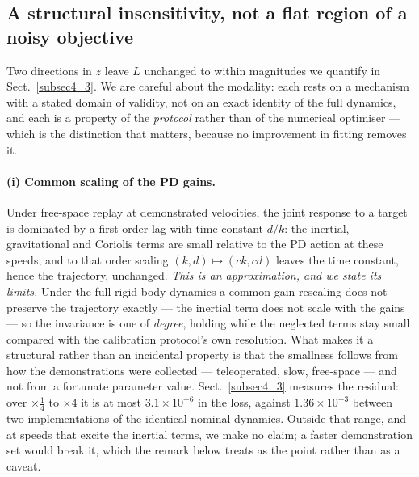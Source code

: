 \documentclass[pdflatex,iicol,sn-apa]{sn-jnl}
\theoremstyle{remark}
\begin{document}
\subsection{A structural insensitivity, not a flat region of a noisy objective}\label{subsec4_2}

Two directions in $z$ leave $L$ unchanged to within magnitudes we quantify in
Sect.~\ref{subsec4_3}. We are careful about the modality: each rests on a mechanism with a stated
domain of validity, not on an exact identity of the full dynamics, and each is a property of the
\emph{protocol} rather than of the numerical optimiser --- which is the distinction that matters,
because no improvement in fitting removes it.

\paragraph{(i) Common scaling of the PD gains.}
Under free-space replay at demonstrated velocities, the joint response to a target is dominated by a
first-order lag with time constant $d/k$: the inertial, gravitational and Coriolis terms are small
relative to the PD action at these speeds, and to that order scaling $(k, d) \mapsto (ck, cd)$ leaves
the time constant, hence the trajectory, unchanged. \emph{This is an approximation, and we state its
limits.} Under the full rigid-body dynamics a common gain rescaling does not preserve the trajectory
exactly --- the inertial term does not scale with the gains --- so the invariance is one of
\emph{degree}, holding while the neglected terms stay small compared with the calibration protocol's
own resolution. What makes it a structural rather than an incidental property is that the smallness
follows from how the demonstrations were collected --- teleoperated, slow, free-space --- and not
from a fortunate parameter value. Sect.~\ref{subsec4_3} measures the residual: over
$\times \tfrac14$ to $\times 4$ it is at most $3.1\times10^{-6}$ in the loss, against $1.36\times10^{-3}$ between
two implementations of the identical nominal dynamics. Outside that range, and at speeds that excite
the inertial terms, we make no claim; a faster demonstration set would break it, which the remark
below treats as the point rather than as a caveat.
\end{document}
